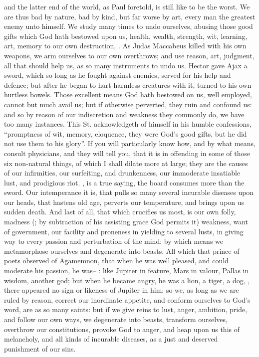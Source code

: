 and the latter end of the world, as Paul foretold, is still
like to be the worst. We are thus bad by nature, bad by kind, but far worse by
art, every man the greatest enemy unto himself. We study many times to undo
ourselves, abusing those good gifts which God hath bestowed upon us, health,
wealth, strength, wit, learning, art, memory to our own destruction,
. As
Judas Maccabeus killed \Apollonius{} with his own weapons, we
arm ourselves to our own overthrows; and use reason, art, judgment, all that
should help us, as so many instruments to undo us. Hector gave Ajax a sword,
which so long as he fought against enemies, served for his help and defence;
but after he began to hurt harmless creatures with it, turned to his own
hurtless bowels. Those excellent means God hath bestowed on us, well employed,
cannot but much avail us; but if otherwise perverted, they ruin and confound
us: and so by reason of our indiscretion and weakness they commonly do, we have
too many instances. This St. \Austin{} acknowledgeth of himself in his humble
confessions, \enquote{promptness of wit, memory, eloquence, they were God's good gifts,
but he did not use them to his glory}. If you will particularly know how, and
by what means, consult physicians, and they will tell you, that it is in
offending in some of those six non-natural things, of which I shall
dilate more at large; they are the causes of our
infirmities, our surfeiting, and drunkenness, our immoderate insatiable lust,
and prodigious riot. , is a true saying, the
board consumes more than the sword. Our intemperance it is, that pulls so many
several incurable diseases upon our heads, that hastens old
age, perverts our temperature, and brings upon us sudden death. And last of
all, that which crucifies us most, is our own folly, madness (; by subtraction of his assisting grace God permits it)
weakness, want of government, our facility and proneness in yielding to several
lusts, in giving way to every passion and perturbation of the mind: by which
means we metamorphose ourselves and degenerate into beasts. All which that
prince of poets observed of Agamemnon, that when he was
well pleased, and could moderate his passion, he was-- : like Jupiter in feature, Mars in valour, Pallas in wisdom, another god;
but when he became angry, he was a lion, a tiger, a dog, \etc{}, there appeared
no sign or likeness of Jupiter in him; so we, as long as we are ruled by
reason, correct our inordinate appetite, and conform ourselves to God's word,
are as so many saints: but if we give reins to lust, anger, ambition, pride,
and follow our own ways, we degenerate into beasts, transform ourselves,
overthrow our constitutions, provoke God to anger, and heap
upon us this of melancholy, and all kinds of incurable diseases, as a just and
deserved punishment of our sins.

